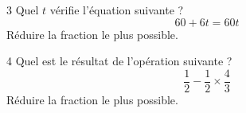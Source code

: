 \begin{frame}{3\vspace{-32pt}}
	Quel $t$ vérifie l'équation suivante ?
		\[ 60+6t = 60t \]
	Réduire la fraction le plus possible.
\end{frame}

\begin{frame}{4\vspace{-32pt}}
	Quel est le résultat de l'opération suivante ?
		\[ \dfrac12 - \dfrac12 \times \dfrac43 \]
	Réduire la fraction le plus possible.
\end{frame}

